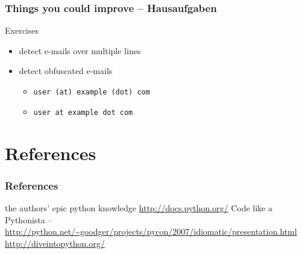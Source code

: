 \documentclass{beamer}
\begin{document}
\begin{frame}[fragile]
	\frametitle{Things you could improve -- Hausaufgaben}
	
	\begin{block}{Exercises}
	\begin{itemize}
	\item[\checkmark] detect e-mails over multiple lines
	\item[\checkmark] detect obfuscated e-mails
		\begin{itemize}
		\item[\checkmark] \texttt{user (at) example (dot) com}
		\item[\checkmark] \texttt{user at example dot com}
		\end{itemize}
	\end{itemize}
	\end{block}
\end{frame}


\section{References}

\begin{frame}
	\frametitle{References}
	\begin{thebibliography}{3}
	 the authors' epic python knowledge
	 \url{http://docs.python.org/}
	 Code like a Pythonista -- \url{http://python.net/~goodger/projects/pycon/2007/idiomatic/presentation.html}
	 \url{http://diveintopython.org/}
	\end{thebibliography}
\end{frame}
\end{document}
